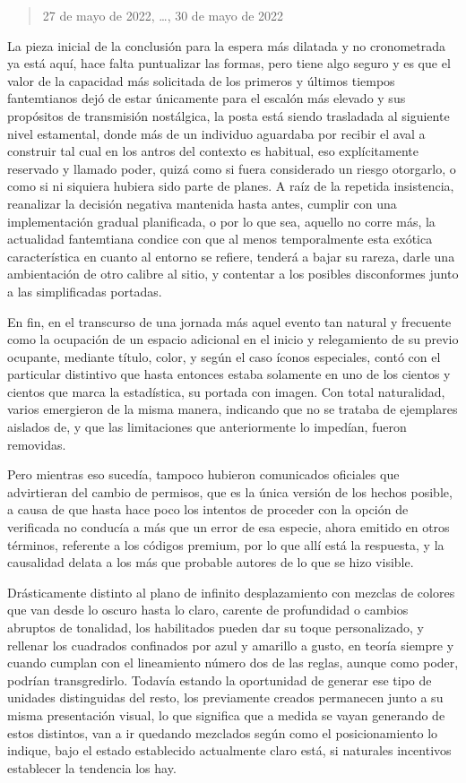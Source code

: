 \documentclass[
]{book}
\begin{document}
\begin{quote}
27 de mayo de 2022, \ldots, 30 de mayo de 2022
\end{quote}

La pieza inicial de la conclusión para la espera más dilatada y no cronometrada ya está aquí, hace falta puntualizar las formas, pero tiene algo seguro y es que el valor de la capacidad más solicitada de los primeros y últimos tiempos fantemtianos dejó de estar únicamente para el escalón más elevado y sus propósitos de transmisión nostálgica, la posta está siendo trasladada al siguiente nivel estamental, donde más de un individuo aguardaba por recibir el aval a construir tal cual en los antros del contexto es habitual, eso explícitamente reservado y llamado poder, quizá como si fuera considerado un riesgo otorgarlo, o como si ni siquiera hubiera sido parte de planes. A raíz de la repetida insistencia, reanalizar la decisión negativa mantenida hasta antes, cumplir con una implementación gradual planificada, o por lo que sea, aquello no corre más, la actualidad fantemtiana condice con que al menos temporalmente esta exótica característica en cuanto al entorno se refiere, tenderá a bajar su rareza, darle una ambientación de otro calibre al sitio, y contentar a los posibles disconformes junto a las simplificadas portadas.

En fin, en el transcurso de una jornada más aquel evento tan natural y frecuente como la ocupación de un espacio adicional en el inicio y relegamiento de su previo ocupante, mediante título, color, y según el caso íconos especiales, contó con el particular distintivo que hasta entonces estaba solamente en uno de los cientos y cientos que marca la estadística, su portada con imagen. Con total naturalidad, varios emergieron de la misma manera, indicando que no se trataba de ejemplares aislados de, y que las limitaciones que anteriormente lo impedían, fueron removidas.

Pero mientras eso sucedía, tampoco hubieron comunicados oficiales que advirtieran del cambio de permisos, que es la única versión de los hechos posible, a causa de que hasta hace poco los intentos de proceder con la opción de verificada no conducía a más que un error de esa especie, ahora emitido en otros términos, referente a los códigos premium, por lo que allí está la respuesta, y la causalidad delata a los más que probable autores de lo que se hizo visible.

Drásticamente distinto al plano de infinito desplazamiento con mezclas de colores que van desde lo oscuro hasta lo claro, carente de profundidad o cambios abruptos de tonalidad, los habilitados pueden dar su toque personalizado, y rellenar los cuadrados confinados por azul y amarillo a gusto, en teoría siempre y cuando cumplan con el lineamiento número dos de las reglas, aunque como poder, podrían transgredirlo. Todavía estando la oportunidad de generar ese tipo de unidades distinguidas del resto, los previamente creados permanecen junto a su misma presentación visual, lo que significa que a medida se vayan generando de estos distintos, van a ir quedando mezclados según como el posicionamiento lo indique, bajo el estado establecido actualmente claro está, si naturales incentivos establecer la tendencia los hay.
\end{document}
